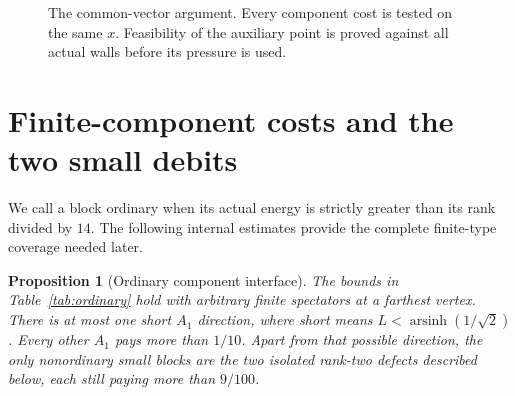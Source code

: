 \documentclass[11pt]{article}
\newtheorem{proposition}[theorem]{Proposition}
\theoremstyle{remark}
\begin{document}
\begin{figure}[ht]
\centering
{}
\caption{The common-vector argument. Every component cost is tested
on the same \(x\). Feasibility of the auxiliary point is proved
against all actual walls before its pressure is used.}
\label{fig:budget}
\end{figure}

\section{Finite-component costs and the two small debits}
\label{sec:ordinary}

We call a block ordinary when its actual energy is strictly greater
than its rank divided by $14$. The following internal estimates
provide the complete finite-type coverage needed later.

\begin{proposition}[Ordinary component interface]\label{prop:ordinary}
The bounds in Table~\ref{tab:ordinary} hold with arbitrary finite
spectators at a farthest vertex. There is at most one short $A_1$
direction, where short means $L<\operatorname{arsinh}(1/\sqrt2)$.
Every other $A_1$ pays more than $1/10$. Apart from that possible
direction, the only nonordinary small blocks are the two isolated
rank-two defects described below, each still paying more than $9/100$.
\end{proposition}
\end{document}
